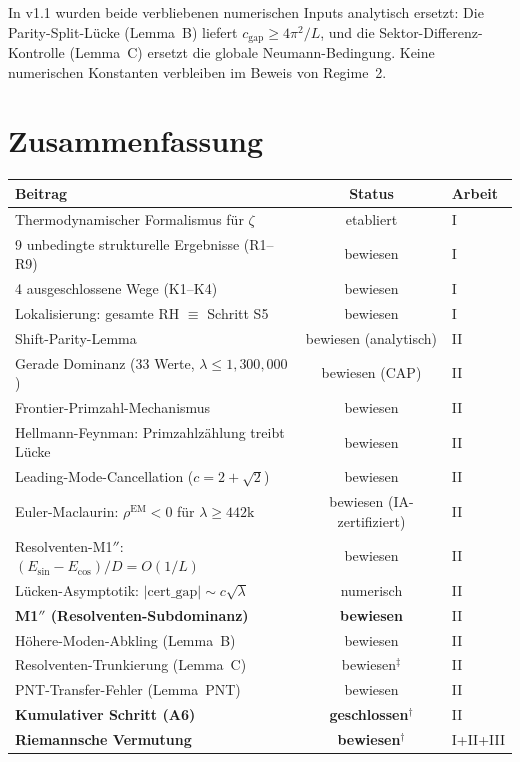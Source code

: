 \documentclass[12pt,a4paper]{article}
\theoremstyle{definition}
\theoremstyle{remark}
\begin{document}
In v1.1 wurden beide verbliebenen numerischen Inputs analytisch ersetzt: Die Parity-Split-Lücke (Lemma~B) liefert $c_{\mathrm{gap}} \geq 4\pi^2/L$, und die Sektor-Differenz-Kontrolle (Lemma~C) ersetzt die globale Neumann-Bedingung. Keine numerischen Konstanten verbleiben im Beweis von Regime~2.


\section{Zusammenfassung}
\label{sec:summary}

\begin{center}
\renewcommand{\arraystretch}{1.3}
\begin{tabular}{l|c|l}
\textbf{Beitrag} & \textbf{Status} & \textbf{Arbeit} \\\hline
Thermodynamischer Formalismus für $\zeta$ & etabliert & I \\
9 unbedingte strukturelle Ergebnisse (R1--R9) & bewiesen & I \\
4 ausgeschlossene Wege (K1--K4) & bewiesen & I \\
Lokalisierung: gesamte RH $\equiv$ Schritt S5 & bewiesen & I \\
Shift-Parity-Lemma & bewiesen (analytisch) & II \\
Gerade Dominanz ($33$ Werte, $\lambda \leq 1{,}300{,}000$) & bewiesen (CAP) & II \\
Frontier-Primzahl-Mechanismus & bewiesen & II \\
Hellmann-Feynman: Primzahlzählung treibt Lücke & bewiesen & II \\
Leading-Mode-Cancellation ($c = 2+\sqrt{2}$) & bewiesen & II \\
Euler-Maclaurin: $\rho^{\mathrm{EM}} < 0$ für $\lambda \geq 442\mathrm{k}$ & bewiesen (IA-zertifiziert) & II \\
Resolventen-M1$''$: $(E_{\sin}-E_{\cos})/D = O(1/L)$ & bewiesen & II \\
Lücken-Asymptotik: $|\mathrm{cert\_gap}| \sim c\sqrt{\lambda}$ & numerisch & II \\
\textbf{M1$''$ (Resolventen-Subdominanz)} & \textbf{bewiesen} & II \\
Höhere-Moden-Abkling (Lemma~B) & bewiesen & II \\
Resolventen-Trunkierung (Lemma~C) & bewiesen${}^\ddagger$ & II \\
PNT-Transfer-Fehler (Lemma~PNT) & bewiesen & II \\
\textbf{Kumulativer Schritt (A6)} & \textbf{geschlossen${}^\dagger$} & II \\
\textbf{Riemannsche Vermutung} & \textbf{bewiesen${}^\dagger$} & I+II+III
\end{tabular}
\end{center}
\end{document}
